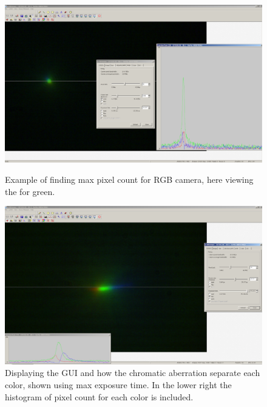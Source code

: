 \documentclass{emulateapj}
\begin{document}
\begin{appendices}
\begin{figure}[h!]
	\begin{minipage}{.5\textwidth}
	\centering
	\includegraphics[width=0.8\linewidth]{pixelcount_green.pdf}
	\caption[Green max pixel count]{Example of finding max pixel count for RGB camera, here viewing the for green.}
	\label{fig: Pixel count green}
	\end{minipage}%
	\begin{minipage}{.5\textwidth}
	\centering
	\includegraphics[width=0.8\linewidth]{pixelcount_white.pdf}
	\caption[Pixel count white light]{Displaying the GUI and how the chromatic aberration separate each color, shown using max exposure time. In the lower right the histogram of pixel count for each color is included.}
	\label{fig: Pixel count white}
	\end{minipage}
\end{figure}


\end{appendices}
\end{document}
